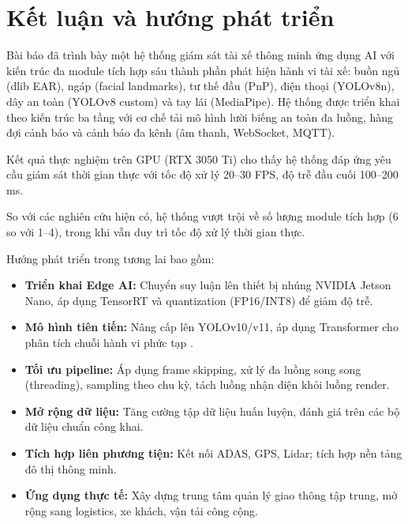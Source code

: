 \section{Kết luận và hướng phát triển}

Bài báo đã trình bày một hệ thống giám sát tài xế thông minh ứng dụng AI với kiến trúc đa module tích hợp sáu thành phần phát hiện hành vi tài xế: buồn ngủ (dlib EAR), ngáp (facial landmarks), tư thế đầu (PnP), điện thoại (YOLOv8n), dây an toàn (YOLOv8 custom) và tay lái (MediaPipe). Hệ thống được triển khai theo kiến trúc ba tầng với cơ chế tải mô hình lười biếng an toàn đa luồng, hàng đợi cảnh báo và cảnh báo đa kênh (âm thanh, WebSocket, MQTT).

Kết quả thực nghiệm trên GPU (RTX 3050 Ti) cho thấy hệ thống đáp ứng yêu cầu giám sát thời gian thực với tốc độ xử lý 20--30 FPS, độ trễ đầu cuối 100--200 ms.

So với các nghiên cứu hiện có, hệ thống vượt trội về số lượng module tích hợp (6 so với 1--4), trong khi vẫn duy trì tốc độ xử lý thời gian thực.

Hướng phát triển trong tương lai bao gồm:
\begin{itemize}[leftmargin=*,nosep]
  \item \textbf{Triển khai Edge AI:} Chuyển suy luận lên thiết bị nhúng NVIDIA Jetson Nano, áp dụng TensorRT và quantization (FP16/INT8) để giảm độ trễ.
  \item \textbf{Mô hình tiên tiến:} Nâng cấp lên YOLOv10/v11, áp dụng Transformer cho phân tích chuỗi hành vi phức tạp \cite{nimma2025}.
  \item \textbf{Tối ưu pipeline:} Áp dụng frame skipping, xử lý đa luồng song song (threading), sampling theo chu kỳ, tách luồng nhận diện khỏi luồng render.
  \item \textbf{Mở rộng dữ liệu:} Tăng cường tập dữ liệu huấn luyện, đánh giá trên các bộ dữ liệu chuẩn công khai.
  \item \textbf{Tích hợp liên phương tiện:} Kết nối ADAS, GPS, Lidar; tích hợp nền tảng đô thị thông minh.
  \item \textbf{Ứng dụng thực tế:} Xây dựng trung tâm quản lý giao thông tập trung, mở rộng sang logistics, xe khách, vận tải công cộng.
\end{itemize}
